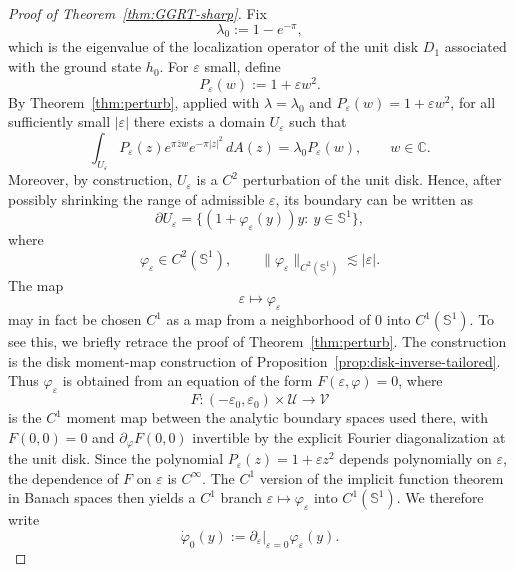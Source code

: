 \documentclass[a4paper,11pt,reqno]{amsart}
\numberwithin{equation}{section}
\theoremstyle{plain} %
\theoremstyle{definition} %
\theoremstyle{remark}
\newcommand{\C}{\mathbb{C}}
\begin{document}
\begin{proof}[Proof of Theorem~\ref{thm:GGRT-sharp}]
Fix
\[
\lambda_0:=1-e^{-\pi},
\]
which is the eigenvalue of the localization operator of the unit disk $D_1$
associated with the ground state $h_0$. For $\varepsilon$ small, define
\[
P_\varepsilon(w):=1+\varepsilon w^2.
\]
By Theorem~\ref{thm:perturb}, applied with \(\lambda=\lambda_0\) and
\(P_\varepsilon(w)=1+\varepsilon w^2\), for all sufficiently small
\(|\varepsilon|\) there exists a domain \(U_\varepsilon\) such that
\begin{equation}\label{eq:functiona-P-eps-new}
\int_{U_\varepsilon} P_\varepsilon(z)e^{\pi \overline zw}e^{-\pi|z|^2}\,dA(z)
=
\lambda_0 P_\varepsilon(w),
\qquad w\in\C.
\end{equation}
Moreover, by construction, $U_\varepsilon$ is a $C^2$ perturbation of the unit
disk. Hence, after possibly shrinking the range of admissible $\varepsilon$,
its boundary can be written as
\begin{equation}\label{eq:def-u-eps-new}
\partial U_\varepsilon
=
\{(1+\varphi_\varepsilon(y))y:\ y\in \mathbb S^1\},
\end{equation}
where
\[
\varphi_\varepsilon\in C^2(\mathbb S^1),
\qquad
\|\varphi_\varepsilon\|_{C^2(\mathbb S^1)}\lesssim |\varepsilon|.
\]
The map
\[
\varepsilon\mapsto \varphi_\varepsilon
\]
may in fact be chosen \(C^1\) as a map from a neighborhood of \(0\) into
\(C^1(\mathbb S^1)\). To see this, we briefly retrace the proof of
Theorem~\ref{thm:perturb}. The construction is the disk moment-map
construction of Proposition~\ref{prop:disk-inverse-tailored}. Thus
\(\varphi_\varepsilon\) is obtained from an equation of the form
\(F(\varepsilon,\varphi)=0\), where
\[
F:(-\varepsilon_0,\varepsilon_0)\times \mathcal U\to \mathcal V
\]
is the \(C^1\) moment map between the analytic boundary spaces used there,
with \(F(0,0)=0\) and \(\partial_\varphi F(0,0)\) invertible by the explicit
Fourier diagonalization at the unit disk. Since the polynomial
\(P_\varepsilon(z)=1+\varepsilon z^2\)
depends polynomially on \(\varepsilon\), the dependence of \(F\) on
\(\varepsilon\) is \(C^\infty\). The \(C^1\) version of the implicit function
theorem in Banach spaces then yields a \(C^1\) branch
\(\varepsilon\mapsto \varphi_\varepsilon\) into \(C^1(\mathbb S^1)\). We
therefore write
\[
\dot\varphi_0(y):=
\left.\partial_\varepsilon\right|_{\varepsilon=0}\varphi_\varepsilon(y).
\]


\end{proof}
\end{document}
